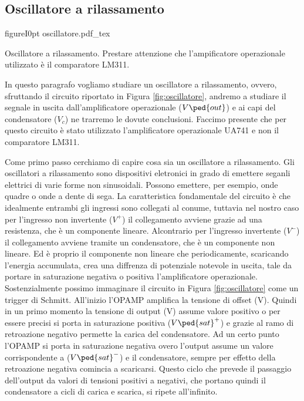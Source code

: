 \subsection*{Oscillatore a rilassamento}

\begin{wrapfloat}{figure}{I}{0pt}
        \def\svgwidth{0.45\textwidth}
        {oscillatore.pdf_tex}
        \caption{Oscillatore a rilassamento. Prestare attenzione che l'ampificatore operazionale utilizzato è il comparatore LM311.}
        \label{fig:oscillatore}
\end{wrapfloat}

In questo paragrafo vogliamo studiare un oscillatore a rilassamento, ovvero, sfruttando il circuito riportato in Figura \ref{fig:oscillatore}, andremo a studiare il segnale in uscita dall'amplificatore operazionale ($V\ped{out}$) e ai capi del condensatore ($V_c$) ne trarremo le dovute conclusioni. Faccimo presente che per questo circuito è stato utilizzato l'amplificatore operazionale UA741 e non il comparatore LM311.

Come primo passo cerchiamo di capire cosa sia un oscillatore a rilassamento. Gli oscillatori a rilassamento sono dispositivi eletronici in grado di emettere seganli elettrici di varie forme non sinusoidali. Possono emettere, per esempio, onde quadre o onde a dente di sega.
La caratteristica fondamentale del circuito è che idealmente entrambi gli ingressi sono collegati al conume, tuttavia nel nostro caso per l'ingresso non invertente ($V^+$) il collegamento avviene grazie ad una resistenza, che è un componente lineare. Alcontrario per l'ingresso invertente ($V^-$) il collegamento avviene tramite un condensatore, che è un componente non lineare. Ed è proprio il componente non lineare che periodicamente, scaricando l'energia accumulata, crea una diffrenza di potenziale notevole in uscita, tale da portare in saturazione negativa o positiva l'amplificatore operazionale.
Sostenzialmente possimo immaginare il circuito in Figura \ref{fig:oscillatore} come un trigger di Schmitt. All'inizio l'OPAMP amplifica la tensione di offset (V). Quindi in un primo momento la tensione di output (V) assume valore positivo o per essere precisi si porta in saturazione positiva ($V\ped{sat}^+$) e grazie al ramo di retroazione negativo permette la carica del condensatore. Ad un certo punto l'OPAMP si porta in saturazione negativa overo l'output assume un valore corrispondente a ($V\ped{sat}^-$) e il condensatore, sempre per effetto della retroazione negativa comincia a scaricarsi. Questo ciclo che prevede il passaggio dell'output da valori di tensioni positivi a negativi, che portano quindi il condensatore a cicli di carica e scarica, si ripete all'infinito.

